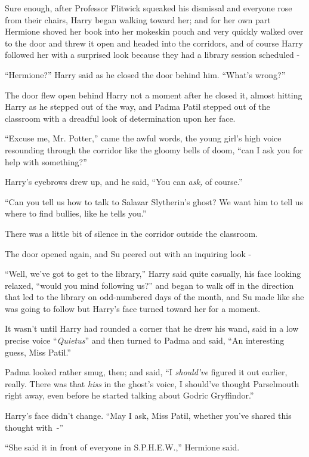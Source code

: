 Sure enough, after Professor Flitwick squeaked his dismissal and everyone rose from their chairs, Harry began walking toward her; and for her own part Hermione shoved her book into her mokeskin pouch and very quickly walked over to the door and threw it open and headed into the corridors, and of course Harry followed her with a surprised look because they had a library session scheduled -

``Hermione?'' Harry said as he closed the door behind him. ``What's wrong?''

The door flew open behind Harry not a moment after he closed it, almost hitting Harry as he stepped out of the way, and Padma Patil stepped out of the classroom with a dreadful look of determination upon her face.

``Excuse me, Mr. Potter,'' came the awful words, the young girl's high voice resounding through the corridor like the gloomy bells of doom, ``can I ask you for help with something?''

Harry's eyebrows drew up, and he said, ``You can \emph{ask,} of course.''

``Can you tell us how to talk to Salazar Slytherin's ghost? We want him to tell us where to find bullies, like he tells you.''

There was a little bit of silence in the corridor outside the classroom.

The door opened again, and Su peered out with an inquiring look -

``Well, we've got to get to the library,'' Harry said quite casually, his face looking relaxed, ``would you mind following us?'' and began to walk off in the direction that led to the library on odd-numbered days of the month, and Su made like she was going to follow but Harry's face turned toward her for a moment.

It wasn't until Harry had rounded a corner that he drew his wand, said in a low precise voice ``\emph{Quietus}'' and then turned to Padma and said, ``An interesting guess, Miss Patil.''

Padma looked rather smug, then; and said, ``I \emph{should've} figured it out earlier, really. There was that \emph{hiss} in the ghost's voice, I should've thought Parselmouth right away, even before he started talking about Godric Gryffindor.''

Harry's face didn't change. ``May I ask, Miss Patil, whether you've shared this thought with~-''

``She said it in front of everyone in S.P.H.E.W.,'' Hermione said.

